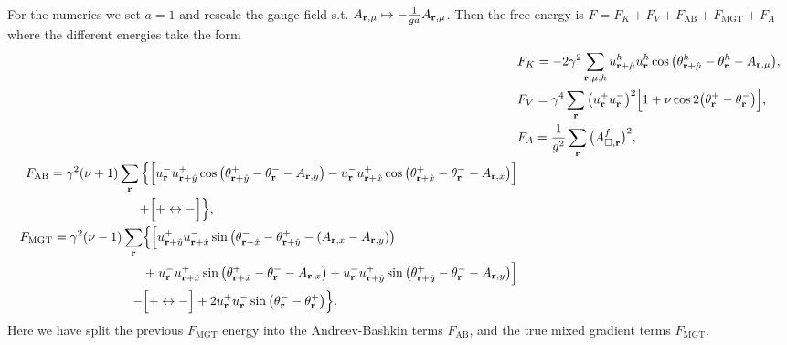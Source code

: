 For the numerics we set $a=1$ and rescale the gauge field s.t. $A_{\v{r},\mu} \mapsto -\frac{1}{ga}A_{\v{r},\mu}$. Then the free energy is $F = F_K + F_V + F_\text{AB} + F_\text{MGT} + F_A$ where
the different energies take the form
\begin{align}
  &F_K = -2\gamma^2\sum_{\v{r},\mu,h}u_{\v{r}+\hat{\mu}}^hu_\v{r}^h\cos\big(\theta_{\v{r}+\hat{\mu}}^h-\theta_\v{r}^h - A_{\v{r},\mu}\big),\label{eq:disc:cp1:rescale:FK}\\
  &F_V = \gamma^4\sum_\v{r}\big(u_\v{r}^+u_\v{r}^-\big)^2\Big[1+\nu\cos2\big(\theta_\v{r}^+ - \theta_\v{r}^-\big)\Big], \label{eq:disc:cp1:rescale:FV}\\
  &F_A = \frac{1}{g^2}\sum_\v{r}\big(A_{\Box,\v{r}}^f\big)^2, \label{eq:disc:cp1:rescale:FA}\\
  \begin{split}
	F_\text{AB} = \gamma^2(\nu+1)\sum_\v{r}\Big\{&\Big[u_\v{r}^-u_{\v{r}+\hat{y}}^+\cos\big(\theta_{\v{r}+\hat{y}}^+ - \theta_\v{r}^- - A_{\v{r},y}\big) 
  - u_\v{r}^-u_{\v{r}+\hat{x}}^+\cos\big(\theta_{\v{r}+\hat{x}}^+-\theta_\v{r}^--A_{\v{r},x}\big)\Big]\\ + &\Big[+\leftrightarrow-\Big]\Big\},
\end{split}\label{eq:disc:cp1:rescale:FAB}\\
  \begin{split}
	F_\text{MGT} = \gamma^2(\nu-1)\sum_\v{r}&\Big\{\Big[u_{\v{r}+\hat{y}}^+u_{\v{r}+\hat{x}}^-\sin\big(\theta_{\v{r}+\hat{x}}^--\theta_{\v{r}+\hat{y}}^+ - (A_{\v{r},x}-A_{\v{r},y})\big)\\
	&+ u_\v{r}^-u_{\v{r}+\hat{x}}^+\sin\big(\theta_{\v{r}+\hat{x}}^+-\theta_\v{r}^--A_{\v{r},x}\big) + u_\v{r}^-u_{\v{r}+\hat{y}}^+\sin\big(\theta_{\v{r}+\hat{y}}^+-\theta_\v{r}^--A_{\v{r},y}\big)\Big]\\
	- &\Big[+\leftrightarrow-\Big] + 2u_\v{r}^+u_\v{r}^-\sin\big(\theta_\v{r}^--\theta_\v{r}^+\big)\Big\}.
  \end{split}\label{eq:disc:cp1:rescale:FMGT}\\
\end{align}
Here we have split the previous $F_\text{MGT}$ energy into the Andreev-Bashkin terms $F_\text{AB}$, and the true mixed gradient terms $F_\text{MGT}$.
